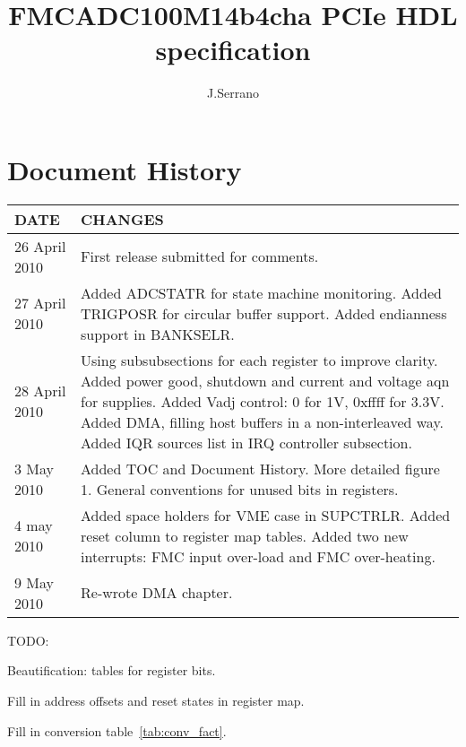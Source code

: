 \documentclass{article}
\title{FMCADC100M14b4cha PCIe HDL specification}
\author{J.Serrano}
\newenvironment{packed_item}{
\begin{itemize}
  \setlength{\itemsep}{1pt}
  \setlength{\parskip}{0pt}
  \setlength{\parsep}{0pt}
}{\end{itemize}}
\begin{document}
\maketitle
\pagebreak

\section*{Document History}
\begin{table}[htbp]
  \centering
  \begin{tabularx}{\textwidth}{|l|X|}
    \hline
    \textbf{DATE} & \textbf{CHANGES} \\
    \hline
    \hline
    26 April 2010 & First release submitted for comments.\\
    \hline
    27 April 2010 & Added ADCSTATR for state machine monitoring. Added TRIGPOSR for circular buffer support. Added endianness support in BANKSELR.\\
    \hline
    28 April 2010 & Using subsubsections for each register to improve clarity. Added power good, shutdown and current and voltage aqn for supplies. Added Vadj control: 0 for 1V, 0xffff for 3.3V. Added DMA, filling host buffers in a non-interleaved way. Added IQR sources list in IRQ controller subsection.\\
    \hline
    3 May 2010 & Added TOC and Document History. More detailed figure 1. General conventions for unused bits in registers. \\ 
    \hline
    4 may 2010 & Added space holders for VME case in SUPCTRLR. Added reset column to register map tables. Added two new interrupts: FMC input over-load and FMC over-heating.\\
    \hline
    9 May 2010 & Re-wrote DMA chapter.\\
    \hline
  \end{tabularx}
\end{table}

TODO: 
\begin{packed_item}
\item Beautification: tables for register bits.
\item Fill in address offsets and reset states in register map.
\item Fill in conversion table~\ref{tab:conv_fact}.
\end{packed_item}

\pagebreak

\tableofcontents{}
\pagebreak
\end{document}
